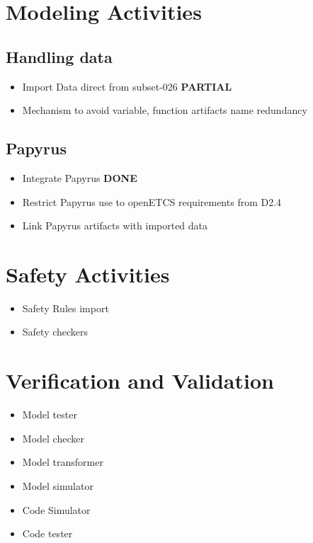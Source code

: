 \documentclass{openetcs_report}
\begin{document}
\section{Modeling Activities}
\label{sec-2-Model}

\subsection{Handling data}
\begin{itemize}
\item Import Data direct from subset-026 {\bf PARTIAL}
\item Mechanism to avoid variable, function artifacts name redundancy
\end{itemize}

\subsection{Papyrus}
\begin{itemize}
\item Integrate Papyrus {\bf DONE}
\item Restrict Papyrus use to openETCS requirements from D2.4
\item Link Papyrus artifacts with imported data
\end{itemize}

\section{Safety Activities}
\begin{itemize}
\item Safety Rules import
\item Safety checkers
\end{itemize}

\section{Verification and Validation}
\begin{itemize}
\item Model tester
\item Model checker
\item Model transformer
\item Model simulator
\item Code Simulator
\item Code tester
\end{itemize}
\end{document}
